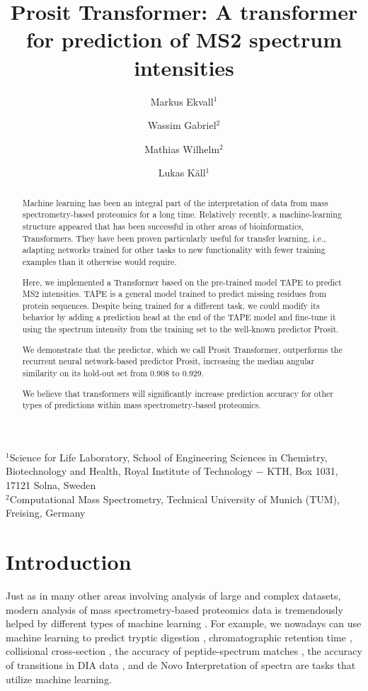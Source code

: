 \documentclass[10pt,a4paper]{article}
\title{Prosit Transformer: A transformer for prediction of MS2 spectrum intensities}
\author{Markus Ekvall$^1$ \and Wassim Gabriel$^2$ \and Mathias Wilhelm$^2$ \and Lukas K\"{a}ll$^1$}
\begin{document}
\maketitle
$^1$Science for Life Laboratory, School of Engineering Sciences in Chemistry, Biotechnology and Health, Royal Institute of Technology − KTH, Box 1031, 17121 Solna, Sweden\\
$^2$Computational Mass Spectrometry, Technical University of Munich (TUM), Freising, Germany

\begin{abstract}
Machine learning has been an integral part of the interpretation of data from mass spectrometry-based proteomics for a long time. Relatively recently, a machine-learning structure appeared that has been successful in other areas of bioinformatics, Transformers. They have been proven particularly useful for transfer learning, i.e., adapting networks trained for other tasks to new functionality with fewer training examples than it otherwise would require. 

Here, we implemented a Transformer based on the pre-trained model TAPE to predict MS2 intensities. TAPE is a general model trained to predict missing residues from protein sequences. Despite being trained for a different task, we could modify its behavior by adding a prediction head at the end of the TAPE model and fine-tune it using the spectrum intensity from the training set to the well-known predictor Prosit.

We demonstrate that the predictor, which we call Prosit Transformer, outperforms the recurrent neural network-based predictor Prosit, increasing the median angular similarity on its hold-out set from 0.908 to 0.929.

We believe that transformers will significantly increase prediction accuracy for other types of predictions within mass spectrometry-based proteomics.
\end{abstract}
  

\section*{Introduction}
Just as in many other areas involving analysis of large and complex datasets, modern analysis of mass spectrometry-based proteomics data is tremendously helped by different types of machine learning \cite{Meyer2021-hc,Mann2021-kx}. For example, we nowadays can use machine learning to predict tryptic digestion \cite{Yang2021-ng}, chromatographic retention time \cite{Moruz2010-ls,Ma2018-wy,Martens_undated-vs}, collisional cross-section \cite{Meier2021-ur}, the accuracy of peptide-spectrum matches \cite{Kall2007-ll}, the accuracy of transitions in DIA data \cite{Demichev2020-zd}, and de Novo Interpretation of spectra \cite{Tran2017-lk} are tasks that utilize machine learning.
\end{document}
